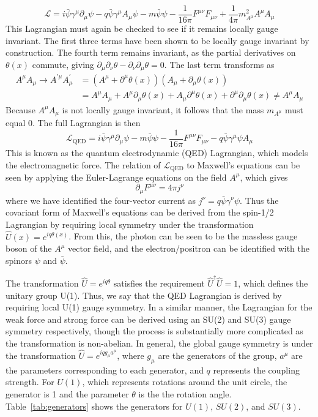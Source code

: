 \begin{equation}
	\mathcal{L}=i\bar{\psi}\gamma^\mu\partial_\mu\psi-q\bar{\psi}\gamma^\mu A_\mu\psi-m\bar{\psi}\psi-\frac{1}{16\pi}F^{\mu\nu}F_{\mu\nu}+\frac{1}{4\pi}m_{A^\mu}^2A^\mu A_\mu
\end{equation}
This Lagrangian must again be checked to see if it remains locally gauge invariant. The first three terms have been shown to be locally gauge invariant by construction. The fourth term remains invariant, as the partial derivatives on $\theta(x)$ commute, giving $\partial_\mu\partial_\nu\theta-\partial_\nu\partial_\mu\theta=0$. The last term transforms as
\begin{align}
	A^\mu A_\mu\to A^{\prime\mu}A_\mu^\prime&=(A^\mu+\partial^\mu\theta(x))(A_\mu+\partial_\mu\theta(x))\\
	&=A^\mu A_\mu+A^\mu\partial_\mu\theta(x)+A_\mu\partial^\mu\theta(x)+\partial^\mu\partial_\mu\theta(x)\neq A^\mu A_\mu
\end{align}
Because $A^\mu A_\mu$ is not locally gauge invariant, it follows that the mass $m_{A^\mu}$ must equal 0. The full Lagrangian is then
\begin{equation}
	\mathcal{L}_\text{QED}=i\bar{\psi}\gamma^\mu\partial_\mu\psi-m\bar{\psi}\psi-\frac{1}{16\pi}F^{\mu\nu}F_{\mu\nu}-q\bar{\psi}\gamma^\mu\psi A_\mu
\end{equation}
This is known as the quantum electrodynamic (QED) Lagrangian, which models the electromagnetic force. The relation of $\mathcal{L}_\text{QED}$ to Maxwell's equations can be seen by applying the Euler-Lagrange equations on the field $A^\mu$, which gives
\begin{equation}
	\label{eq:maxwell}
	\partial_\mu F^{\mu\nu}=4\pi j^\nu
\end{equation}
where we have identified the four-vector current as $j^\nu=q\bar{\psi}\gamma^\nu\psi$. Thus the covariant form of Maxwell's equations can be derived from the spin-1/2 Lagrangian by requiring local symmetry under the transformation $\hat{U}(x)=e^{iq\theta(x)}$. From this, the photon can be seen to be the massless gauge boson of the $A^\mu$ vector field, and the electron/positron can be identified with the spinors $\psi$ and $\bar{\psi}$.

The transformation $\hat{U}=e^{iq\theta}$ satisfies the requirement $\hat{U}^\dagger\hat{U}=1$, which defines the unitary group U(1). Thus, we say that the QED Lagrangian is derived by requiring local U(1) gauge symmetry. In a similar manner, the Lagrangian for the weak force and strong force can be derived using an SU(2) and SU(3) gauge symmetry respectively, though the process is substantially more complicated as the transformation is non-abelian. In general, the global gauge symmetry is under the transformation $\hat{U}=e^{iqg_\mu a^\mu}$, where $g_\mu$ are the generators of the group, $a^\mu$ are the parameters corresponding to each generator, and $q$ represents the coupling strength. For $U(1)$, which represents rotations around the unit circle, the generator is 1 and the parameter $\theta$ is the  the rotation angle. Table~\ref{tab:generators} shows the generators for $U(1)$, $SU(2)$, and $SU(3)$.

